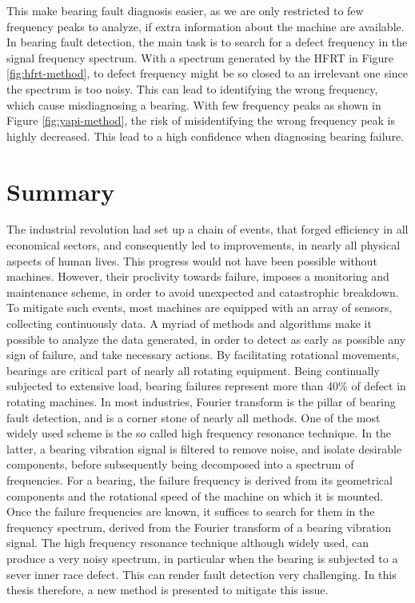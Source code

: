 \documentclass[../Main/thesis.tex]{subfiles}
\begin{document}
This make bearing fault diagnosis easier, as we are only restricted to few frequency peaks to analyze, if extra information about the machine are available.
\justify
In bearing fault detection, the main task is to search for a defect frequency in the signal frequency spectrum. With a spectrum generated by the HFRT in Figure \ref{fig:hfrt-method}, to defect frequency might be so closed to an irrelevant one since the spectrum is too noisy. This can lead to identifying the wrong frequency, which cause misdiagnosing a bearing. With few frequency peaks as shown in Figure \ref{fig:yapi-method}, the risk of misidentifying the wrong frequency peak is highly decreased. This lead to a high confidence when diagnosing bearing failure.
	\section{Summary}
	\label{sec:summary_and_conclusions}
	The industrial revolution had set up a chain of events, that forged efficiency in all economical sectors, and consequently led to improvements, in nearly all physical aspects of human lives. This progress would not have been possible without machines. However, their proclivity towards failure, imposes a monitoring and maintenance scheme, in order to avoid unexpected and catastrophic breakdown. To mitigate such events, most machines are equipped with an array of sensors, collecting continuously data. A myriad of methods and algorithms make it possible to analyze the data generated, in order to detect as early as possible any sign of failure, and take necessary actions.
	\justify
	By facilitating rotational movements, bearings are critical part of nearly all rotating equipment. Being continually subjected to extensive load, bearing failures represent more than 40$\%$ of defect in rotating machines. In most industries, Fourier transform is the pillar of bearing fault detection, and is a corner stone of nearly all methods.
	One of the most widely used scheme is the so called high frequency resonance technique. 
	In the latter, a bearing vibration signal is filtered to remove noise, and isolate desirable components, before subsequently being decomposed into a spectrum of frequencies. For a bearing, the failure frequency is derived from its geometrical components and the rotational speed of the machine on which it is mounted. Once the failure frequencies are known, it suffices to search for them in the frequency spectrum, derived from the Fourier transform of a bearing vibration signal. 
	\justify
	The high frequency resonance technique although widely used, can produce a very noisy spectrum, in particular when the bearing is subjected to a sever inner race defect. This can render fault detection very challenging. In this thesis therefore, a new method is presented to mitigate this issue.
\end{document}
